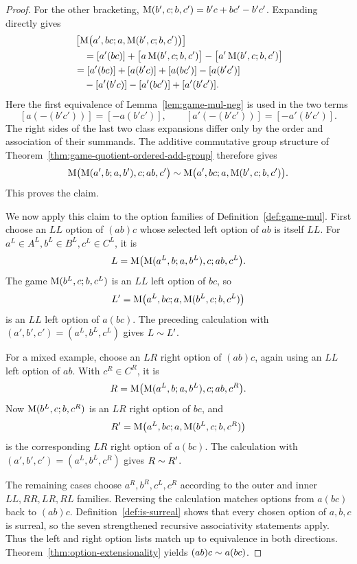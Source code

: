 \begin{proof}
  For the other bracketing,
  \(\operatorname{M}(b',c;b,c')=b'c+bc'-b'c'\).  Expanding directly gives
  \[
    \begin{aligned}
      &\left[
        \operatorname{M}\bigl(a',bc;a,\operatorname{M}(b',c;b,c')\bigr)
      \right]\\
      &\quad=[a'(bc)]
        +\bigl[a\operatorname{M}(b',c;b,c')\bigr]
        -\bigl[a'\operatorname{M}(b',c;b,c')\bigr]\\
        &=[a'(bc)]+[a(b'c)]+[a(bc')]-[a(b'c')]\\
        &\quad-[a'(b'c)]-[a'(bc')]+[a'(b'c')].
    \end{aligned}
  \]
  Here the first equivalence of Lemma~\ref{lem:game-mul-neg} is used in the
  two terms
  \[
    [a(-(b'c'))]=[-a(b'c')],
    \qquad
    [a'(-(b'c'))]=[-a'(b'c')].
  \]
  The right sides of the last two class expansions differ only by the order
  and association of their summands.  The additive commutative group structure
  of Theorem~\ref{thm:game-quotient-ordered-add-group} therefore gives
  \[
    \operatorname{M}\bigl(\operatorname{M}(a',b;a,b'),c;ab,c'\bigr)
      \sim
    \operatorname{M}\bigl(a',bc;a,\operatorname{M}(b',c;b,c')\bigr).
  \]
  This proves the claim.

  We now apply this claim to the option families of
  Definition~\ref{def:game-mul}.  First choose an \(LL\) option of \((ab)c\)
  whose selected left option of \(ab\) is itself \(LL\).  For
  \(a^L\in A^L,b^L\in B^L,c^L\in C^L\), it is
  \[
    L=\operatorname{M}\bigl(\operatorname{M}(a^L,b;a,b^L),c;ab,c^L\bigr).
  \]
  The game \(\operatorname{M}(b^L,c;b,c^L)\) is an \(LL\) left option of \(bc\), so
  \[
    L'=\operatorname{M}\bigl(a^L,bc;a,\operatorname{M}(b^L,c;b,c^L)\bigr)
  \]
  is an \(LL\) left option of \(a(bc)\).  The preceding calculation with
  \((a',b',c')=(a^L,b^L,c^L)\) gives \(L\sim L'\).

  For a mixed example, choose an \(LR\) right option of \((ab)c\), again
  using an \(LL\) left option of \(ab\).  With \(c^R\in C^R\), it is
  \[
    R=\operatorname{M}\bigl(\operatorname{M}(a^L,b;a,b^L),c;ab,c^R\bigr).
  \]
  Now \(\operatorname{M}(b^L,c;b,c^R)\) is an \(LR\) right option of \(bc\), and
  \[
    R'=\operatorname{M}\bigl(a^L,bc;a,\operatorname{M}(b^L,c;b,c^R)\bigr)
  \]
  is the corresponding \(LR\) right option of \(a(bc)\).  The calculation
  with \((a',b',c')=(a^L,b^L,c^R)\) gives \(R\sim R'\).

  The remaining cases choose \(a^R,b^R,c^L,c^R\) according to the outer and
  inner \(LL,RR,LR,RL\) families.  Reversing the calculation matches options
  from \(a(bc)\) back to \((ab)c\).  Definition~\ref{def:is-surreal} shows
  that every chosen option of \(a,b,c\) is surreal, so the seven strengthened
  recursive associativity statements apply.  Thus the left and right option
  lists match up to equivalence in both directions.
  Theorem~\ref{thm:option-extensionality} yields
  \((ab)c\sim a(bc)\).
\end{proof}
